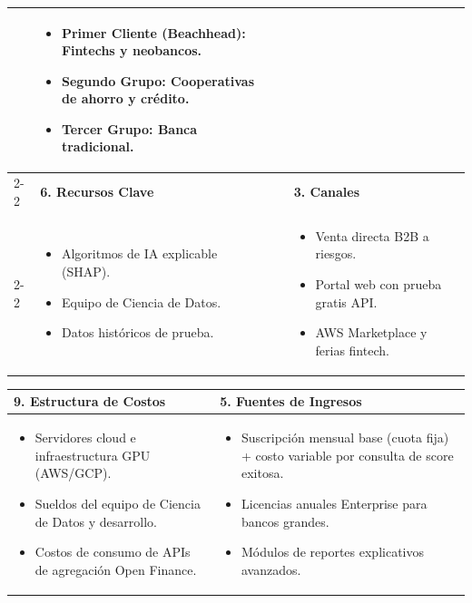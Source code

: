\documentclass[11pt,a4paper]{article}
\begin{document}
\begin{table}[h!]
\begin{tabularx}{\linewidth}{|X|X|X|X|X|}
\begin{itemize}[leftmargin=*]
\end{itemize} & 
\begin{itemize}[leftmargin=*]
    \item \textbf{Primer Cliente (Beachhead):} Fintechs y neobancos.
    \item \textbf{Segundo Grupo:} Cooperativas de ahorro y crédito.
    \item \textbf{Tercer Grupo:} Banca tradicional.
\end{itemize} \\
\cline{2-2} \cline{4-4}
 & \rowcolor{lightgray} 
\textbf{6. Recursos Clave} & & \rowcolor{lightgray} 
\textbf{3. Canales} & \\
\cline{2-2} \cline{4-4}
 & \begin{itemize}[leftmargin=*]
    \item Algoritmos de IA explicable (SHAP).
    \item Equipo de Ciencia de Datos.
    \item Datos históricos de prueba.
\end{itemize} & & \begin{itemize}[leftmargin=*]
    \item Venta directa B2B a riesgos.
    \item Portal web con prueba gratis API.
    \item AWS Marketplace y ferias fintech.
\end{itemize} & \\
\hline
\end{tabularx}
\end{table}

\begin{table}[h!]
\centering
\small
\begin{tabularx}{\linewidth}{|X|X|}
\hline
\rowcolor{lightgray}
\textbf{9. Estructura de Costos} & 
\textbf{5. Fuentes de Ingresos} \\
\hline
\begin{itemize}[leftmargin=*]
    \item Servidores cloud e infraestructura GPU (AWS/GCP).
    \item Sueldos del equipo de Ciencia de Datos y desarrollo.
    \item Costos de consumo de APIs de agregación Open Finance.
\end{itemize} & 
\begin{itemize}[leftmargin=*]
    \item Suscripción mensual base (cuota fija) + costo variable por consulta de score exitosa.
    \item Licencias anuales Enterprise para bancos grandes.
    \item Módulos de reportes explicativos avanzados.
\end{itemize} \\
\hline
\end{tabularx}
\end{table}
\end{document}
